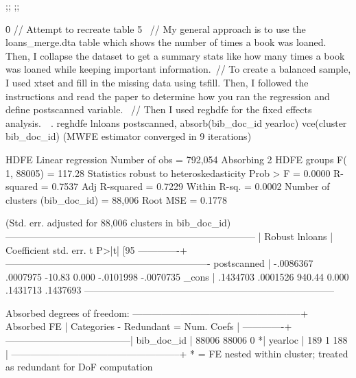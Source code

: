 {\ansi{}
{;;}
{\*\expandedcolortbl;;}
\pard{}\pardirnatural{}

\f0  // Attempt to recreate table 5 \
// My general approach is to use the loans_merge.dta table which shows the number of times a book was loaned. Then, I collapse the dataset to get a summary stats like how many times a book was loaned while keeping important information.\
// To create a balanced sample, I used xtset and fill in the missing data using tsfill. Then, I followed the instructions and read the paper to determine how you ran the regression and define postscanned variable. \
// Then I used reghdfe for the fixed effects analysis.\
\
. reghdfe lnloans postscanned, absorb(bib_doc_id yearloc) vce(cluster bib_doc_id)
(MWFE estimator converged in 9 iterations)

HDFE Linear regression                            Number of obs   =    792,054
Absorbing 2 HDFE groups                           F(   1,  88005) =     117.28
Statistics robust to heteroskedasticity           Prob > F        =     0.0000
                                                  R-squared       =     0.7537
                                                  Adj R-squared   =     0.7229
                                                  Within R-sq.    =     0.0002
Number of clusters (bib_doc_id) =     88,006      Root MSE        =     0.1778

                        (Std. err. adjusted for 88,006 clusters in bib_doc_id)
------------------------------------------------------------------------------
             |               Robust
     lnloans | Coefficient  std. err.      t    P>|t|     [95%
-------------+----------------------------------------------------------------
 postscanned |  -.0086367   .0007975   -10.83   0.000    -.0101998   -.0070735
       _cons |   .1434703   .0001526   940.44   0.000     .1431713    .1437693
------------------------------------------------------------------------------

Absorbed degrees of freedom:
-----------------------------------------------------+
 Absorbed FE | Categories  - Redundant  = Num. Coefs |
-------------+---------------------------------------|
  bib_doc_id |     88006       88006           0    *|
     yearloc |       189           1         188     |
-----------------------------------------------------+
* = FE nested within cluster; treated as redundant for DoF computation

}
